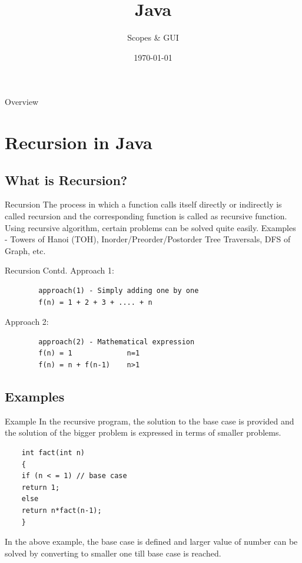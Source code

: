 


\title{Java}
\subtitle{Scopes \& GUI}
\date{\today}



\begin{frame}
\titlepage
\end{frame}

\begin{frame}{Overview}
\tableofcontents
\end{frame}

\section{Recursion in Java}
\subsection{What is Recursion?}
\begin{frame}[fragile]{Recursion}
	The process in which a function calls itself directly or indirectly is called recursion and the corresponding function is called as recursive function. Using recursive algorithm, certain problems can be solved quite easily. Examples - Towers of Hanoi (TOH), Inorder/Preorder/Postorder Tree Traversals, DFS of Graph, etc.
\end{frame}
\begin{frame}[fragile]{Recursion Contd.}
	Approach 1:
	\begin{lstlisting}
		approach(1) - Simply adding one by one
		f(n) = 1 + 2 + 3 + .... + n 
	\end{lstlisting}
    Approach 2:
    \begin{lstlisting}
        approach(2) - Mathematical expression 
    	f(n) = 1             n=1
    	f(n) = n + f(n-1)    n>1
    \end{lstlisting}
\end{frame}
\subsection{Examples}
\begin{frame}[fragile]{Example}
	In the recursive program, the solution to the base case is provided and the solution of the bigger problem is expressed in terms of smaller problems.
	\begin{lstlisting} 
	int fact(int n)
	{
	if (n < = 1) // base case
	return 1;
	else    
	return n*fact(n-1);    
	}	
	\end{lstlisting}
	In the above example, the base case is defined and larger value of number can be solved by converting to smaller one till base case is reached.
\end{frame}

